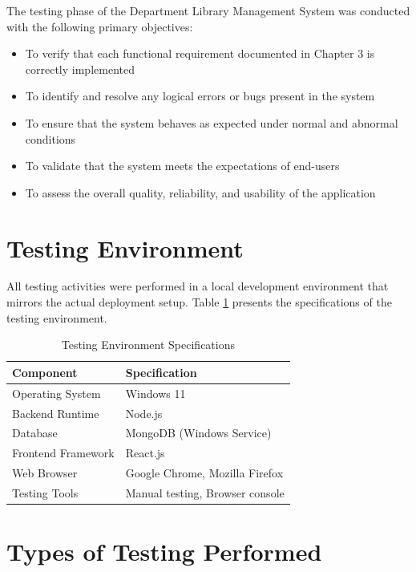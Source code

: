 \documentclass[12pt,a4paper]{report}
\begin{document}
The testing phase of the Department Library Management System was conducted with the following primary objectives:

\begin{itemize}
    \item To verify that each functional requirement documented in Chapter 3 is correctly implemented
    \item To identify and resolve any logical errors or bugs present in the system
    \item To ensure that the system behaves as expected under normal and abnormal conditions
    \item To validate that the system meets the expectations of end-users
    \item To assess the overall quality, reliability, and usability of the application
\end{itemize}

\section{Testing Environment}

All testing activities were performed in a local development environment that mirrors the actual deployment setup. Table \ref{tab:testenv} presents the specifications of the testing environment.

\vspace{0.3cm}

\begin{table}[h]
\centering
\begin{tabular}{|l|l|}
\hline
\textbf{Component} & \textbf{Specification} \\
\hline
Operating System & Windows 11 \\
\hline
Backend Runtime & Node.js \\
\hline
Database & MongoDB (Windows Service) \\
\hline
Frontend Framework & React.js \\
\hline
Web Browser & Google Chrome, Mozilla Firefox \\
\hline
Testing Tools & Manual testing, Browser console \\
\hline
\end{tabular}
\caption{Testing Environment Specifications}
\label{tab:testenv}
\end{table}

\section{Types of Testing Performed}
\end{document}
